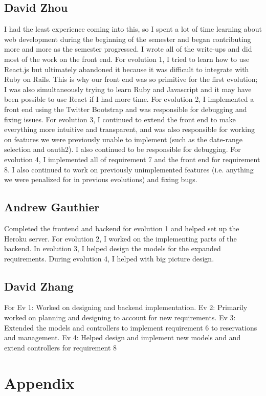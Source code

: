 \documentclass{article}
\begin{document}
\subsection{David Zhou}
I had the least experience coming into this, so I spent a lot of time learning about web development during the beginning of the semester and began contributing more and more as the semester progressed.  I wrote all of the write-ups and did most of the work on the front end.  For evolution 1, I tried to learn how to use React.js but ultimately abandoned it because it was difficult to integrate with Ruby on Rails.  This is why our front end was so primitive for the first evolution; I was also simultaneously trying to learn Ruby and Javascript and it may have been possible to use React if I had more time.  For evolution 2, I implemented a front end using the Twitter Bootstrap and was responsible for debugging and fixing issues.  For evolution 3, I continued to extend the front end to make everything more intuitive and transparent, and was also responsible for working on features we were previously unable to implement (such as the date-range selection and oauth2).  I also continued to be responsible for debugging.  For evolution 4, I implemented all of requirement 7 and the front end for requirement 8. I also continued to work on previously unimplemented features (i.e. anything we were penalized for in previous evolutions) and fixing bugs.
\subsection{Andrew Gauthier}
Completed the frontend and backend for evolution 1 and helped set up the Heroku server. For evolution 2, I worked on the implementing parts of the backend. In evolution 3, I helped design the models for the expanded requirements. During evolution 4, I helped with big picture design.
\subsection{David Zhang}
For Ev 1: Worked on designing and backend implementation. Ev 2: Primarily worked on planning and designing to account for new requirements. Ev 3: Extended the models and controllers to implement requirement 6 to reservations and management. Ev 4: Helped design and implement new models and and extend controllers for requirement 8
\section{Appendix}
\end{document}
